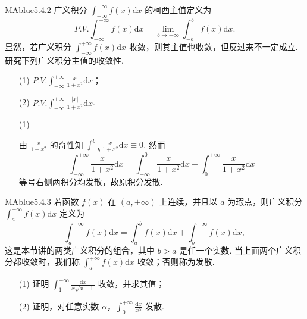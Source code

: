 \begin{problem}{MAblue}{5.4.2}
    广义积分 $\int_{-\infty}^{+\infty} f(x) \mathrm dx$ 的柯西主值定义为
    \[
        P.V. \int_{-\infty}^{+\infty} f(x) \mathrm dx = \lim_{b \to +\infty} \int_{-b}^b f(x) \mathrm dx.
    \]
    显然，若广义积分 $\int_{-\infty}^{+\infty} f(x) \mathrm dx$ 收敛，则其主值也收敛，但反过来不一定成立. 研究下列广义积分主值的收敛性.
    \begin{multicols}{2}
        \begin{enumerate}
            \item[(1)]
            $\displaystyle P.V. \int_{-\infty}^{+\infty} \frac x {1+x^2} \mathrm dx$；
            \item[(2)]
            $\displaystyle P.V. \int_{-\infty}^{+\infty} \frac{|x|}{1+x^2} \mathrm dx$.
        \end{enumerate}
    \end{multicols}
\end{problem}

\begin{enumerate}
    \item[(1)]
    \begin{solution}
        由 $\frac x {1+x^2}$ 的奇性知 $\int_{-b}^b \frac x {1+x^2} \mathrm dx \equiv 0$. 然而
        \[
            \int_{-\infty}^{+\infty} \frac x {1+x^2} \mathrm dx = \int_{-\infty}^0 \frac x {1+x^2} \mathrm dx + \int_0^{+\infty} \frac x {1+x^2} \mathrm dx
        \]
        等号右侧两积分均发散，故原积分发散.
    \end{solution}
\end{enumerate}

\begin{problem}{MAblue}{5.4.3}
    若函数 $f(x)$ 在 $(a, +\infty)$ 上连续，并且以 $a$ 为瑕点，则广义积分 $\int_a^{+\infty} f(x) \mathrm dx$ 定义为
    \[
        \int_a^{+\infty} f(x) \mathrm dx = \int_a^b f(x) \mathrm dx + \int_b^{+\infty} f(x) \mathrm dx,
    \]
    这是本节讲的两类广义积分的组合，其中 $b > a$ 是任一个实数. 当上面两个广义积分都收敛时，我们称 $\int_a^{+\infty} f(x) \mathrm dx$ 收敛；否则称为发散.
    \begin{enumerate}
        \item[(1)]
        证明 $\displaystyle \int_1^{+\infty} \frac{\mathrm dx}{x\sqrt{x-1}}$ 收敛，并求其值；
        \item[(2)]
        证明，对任意实数 $\alpha$，$\displaystyle \int_0^{+\infty} \frac{\mathrm dx}{x^\alpha}$ 发散.
    \end{enumerate}
\end{problem}

